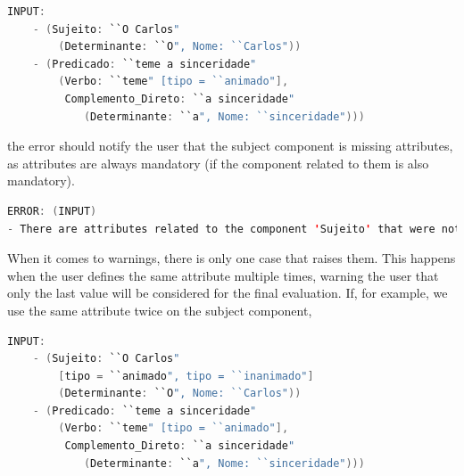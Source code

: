 \begin{center}
\begin{minipage}{13cm}
\begin{lstlisting}[language=java, basicstyle=\small, label={lst:meta_input_missing_attr}, caption=Example of the students parsing with missing attribute]
INPUT:
    - (Sujeito: ``O Carlos"
        (Determinante: ``O", Nome: ``Carlos"))
    - (Predicado: ``teme a sinceridade" 
        (Verbo: ``teme" [tipo = ``animado"], 
         Complemento_Direto: ``a sinceridade" 
            (Determinante: ``a", Nome: ``sinceridade")))
\end{lstlisting}
\end{minipage}
\end{center}

\noindent the error should notify the user that the subject component is missing attributes, as attributes are always mandatory (if the component related to them is also
mandatory).

\begin{center}
\begin{minipage}{14cm}
\begin{lstlisting}[language=java, basicstyle=\small, label={lst:err_msg_missing_attr}, caption=Example error message of missing attributes]
ERROR: (INPUT)
- There are attributes related to the component 'Sujeito' that were not defined.
\end{lstlisting}
\end{minipage}
\end{center}

When it comes to warnings, there is only one case that raises them. This happens when the user defines the same attribute multiple times, warning the user that only the
last value will be considered for the final evaluation. If, for example, we use the same attribute twice on the subject component,

\begin{center}
\begin{minipage}{14cm}
\begin{lstlisting}[language=java, basicstyle=\small, label={lst:meta_input_attr_twice}, caption=Example of the students parsing with the same attribute in a single component]
INPUT:
    - (Sujeito: ``O Carlos" 
        [tipo = ``animado", tipo = ``inanimado"]
        (Determinante: ``O", Nome: ``Carlos"))
    - (Predicado: ``teme a sinceridade" 
        (Verbo: ``teme" [tipo = ``animado"], 
         Complemento_Direto: ``a sinceridade" 
            (Determinante: ``a", Nome: ``sinceridade")))
\end{lstlisting}
\end{minipage}
\end{center}

